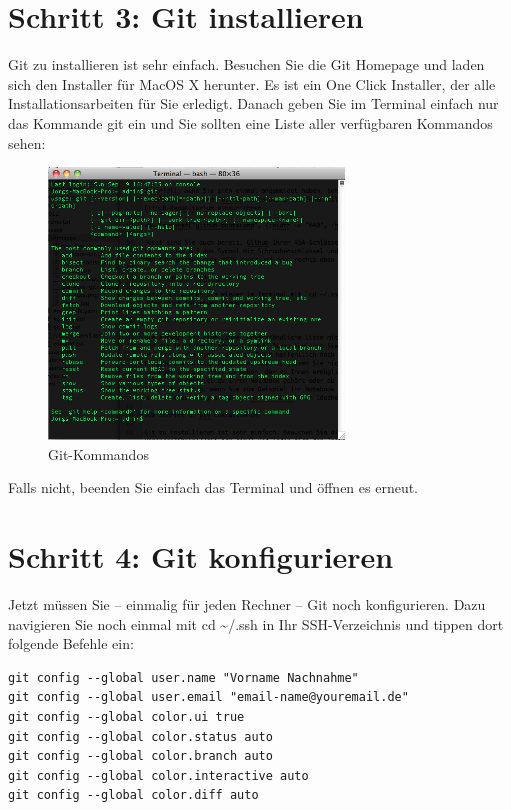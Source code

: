 \documentclass[11pt]{report}
\begin{document}
\section{Schritt 3: Git installieren}
\label{sec-2-11-3}


Git zu installieren ist sehr einfach. Besuchen Sie die Git Homepage
und laden sich den Installer für MacOS X herunter. Es ist ein One
Click Installer, der alle Installationsarbeiten für Sie
erledigt. Danach geben Sie im Terminal einfach nur das Kommande git
ein und Sie sollten eine Liste aller verfügbaren Kommandos sehen:

\begin{figure}[h!]
\centering
\includegraphics[width=0.7\textwidth]{./images/git-kommandos.png}
\caption{\label{git-kommandos}Git-Kommandos}
\end{figure}

Falls nicht, beenden Sie einfach das Terminal und öffnen es erneut.
\section{Schritt 4: Git konfigurieren}
\label{sec-2-11-4}


Jetzt müssen Sie – einmalig für jeden Rechner – Git noch
konfigurieren. Dazu navigieren Sie noch einmal mit cd \~{}/.ssh in Ihr
SSH-Verzeichnis und tippen dort folgende Befehle ein:


\begin{verbatim}
git config --global user.name "Vorname Nachnahme"
git config --global user.email "email-name@youremail.de"
git config --global color.ui true
git config --global color.status auto
git config --global color.branch auto
git config --global color.interactive auto
git config --global color.diff auto
\end{verbatim}
 
\end{document}
